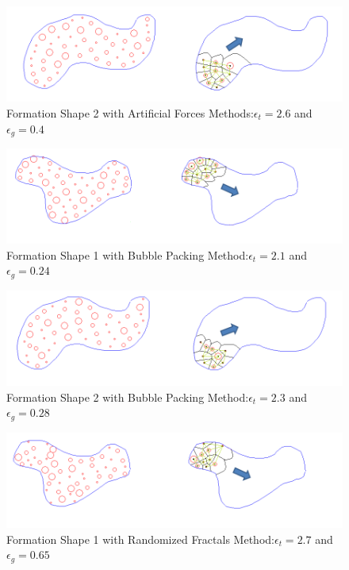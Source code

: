 \begin{figure}[H]
\caption{Formation Shape 2 with Artificial Forces Methods:$\epsilon_t = 2.6$ and $\epsilon_g = 0.4$}
\centerline{\includegraphics[scale = 0.65]{Artificial_Forces_Mesh_2}}
\end{figure} 		
		
\begin{figure}[H]
\caption{Formation Shape 1 with Bubble Packing Method:$\epsilon_t = 2.1$ and $\epsilon_g = 0.24$}
\centerline{\includegraphics[scale = 0.70]{Bubble_Packing_Mesh_1}}
\end{figure} 	
				
\begin{figure}[H]
\caption{Formation Shape 2 with Bubble Packing Method:$\epsilon_t = 2.3$ and $\epsilon_g = 0.28$}
\centerline{\includegraphics[scale = 0.65]{Bubble_Packing_Mesh_2}}
\end{figure} 			
						
\begin{figure}[H]
\caption{Formation Shape 1 with Randomized Fractals Method:$\epsilon_t = 2.7$ and $\epsilon_g = 0.65$}
\centerline{\includegraphics[scale = 0.70]{Randomized_Fractals_Mesh_1}}
\end{figure} 	

